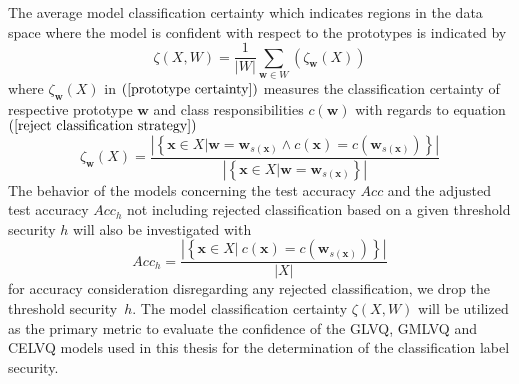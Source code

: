 \documentclass[english]{HSMW-Thesis}
\begin{document}
The average model classification certainty which indicates regions in the data space where the model is confident with respect to the prototypes is indicated by  
\begin{equation*}\label{model certainty}
\zeta(X,W) = \frac{1}{|W|}\sum_{\mathbf{w}\in W}(\zeta_{\mathbf{w}}(X))
\end{equation*}
where $\zeta_{\mathbf{w}}(X)$\hspace{2pt} in $\left( \ref{prototype certainty}\right) $ measures the classification certainty of respective prototype\hspace{2pt} $\mathbf{w}$ and class responsibilities\hspace{2pt} $c \left(\mathbf{w}\right) $ with regards to equation $\left( \ref{reject classification strategy}\right)$  \cite{villmann2018probabilistic} 
\begin{equation}\label{prototype certainty}
\zeta_{\mathbf{w}}(X) = \frac{|\left\{\mathbf{x}\in X|\mathbf{w} = \mathbf{w}_{s(\mathbf{x})}\wedge c(\mathbf{x}) = c(\mathbf{w}_{s(\mathbf{x})})\right\}|}{|\left\{\mathbf{x}\in X|\mathbf{w} = \mathbf{w}_{s(\mathbf{x})}\right\}|}
\end{equation}
The behavior of the models concerning the test accuracy \hspace{2pt}$Acc$\hspace{2pt} and the  adjusted test accuracy\hspace{2pt} $Acc_{h} $\hspace{2pt} not including rejected classification based on a given threshold security \hspace{2pt}$h$\hspace{2pt} will also be investigated with
\begin{equation}\label{model accuracy}
	Acc_{h} = \frac{|\left\{\mathbf{x}\in X|\ c(\mathbf{x}) = c(\mathbf{w}_{s(\mathbf{x})})\right\}|}{| X|}
\end{equation}
for accuracy consideration disregarding any rejected classification, we drop the threshold security\hspace{2pt}\ $h$.
The model classification certainty\hspace{2pt} $\zeta(X,W)$\hspace{2pt}  will be utilized as the primary metric to evaluate the confidence of the GLVQ, GMLVQ and CELVQ models used in this thesis for the determination of the classification label security.
\end{document}
